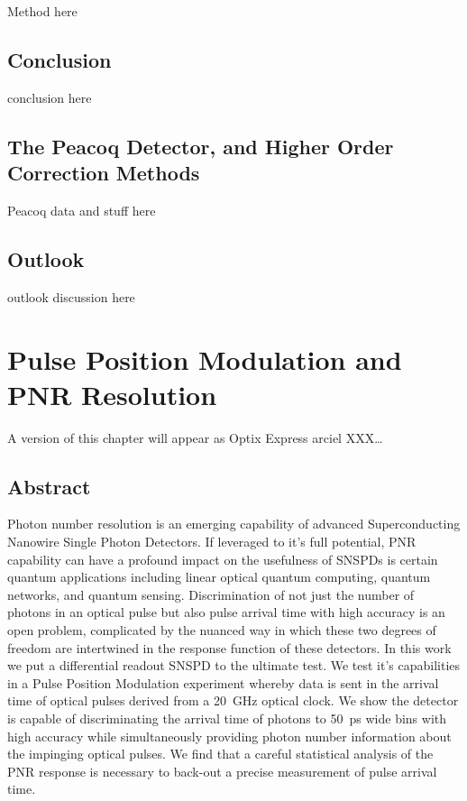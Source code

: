 \documentclass[11pt]{caltech_thesis} %
\begin{document}
Method here

\hypertarget{conclusion}{%
\section{Conclusion}\label{conclusion}}

conclusion here

\hypertarget{the-peacoq-detector-and-higher-order-correction-methods}{%
\section{The Peacoq Detector, and Higher Order Correction
Methods}\label{the-peacoq-detector-and-higher-order-correction-methods}}

Peacoq data and stuff here

\hypertarget{outlook}{%
\section{Outlook}\label{outlook}}

outlook discussion here

\hypertarget{pulse-position-modulation-and-pnr-resolution}{%
\chapter{Pulse Position Modulation and PNR
Resolution}\label{pulse-position-modulation-and-pnr-resolution}}

A version of this chapter will appear as Optix Express arciel
XXX\ldots{}

\hypertarget{abstract-2}{%
\section{Abstract}\label{abstract-2}}

Photon number resolution is an emerging capability of advanced
Superconducting Nanowire Single Photon Detectors. If leveraged to it's
full potential, PNR capability can have a profound impact on the
usefulness of SNSPDs is certain quantum applications including linear
optical quantum computing, quantum networks, and quantum sensing.
Discrimination of not just the number of photons in an optical pulse but
also pulse arrival time with high accuracy is an open problem,
complicated by the nuanced way in which these two degrees of freedom are
intertwined in the response function of these detectors. In this work we
put a differential readout SNSPD to the ultimate test. We test it's
capabilities in a Pulse Position Modulation experiment whereby data is
sent in the arrival time of optical pulses derived from a 20~GHz optical
clock. We show the detector is capable of discriminating the arrival
time of photons to 50~ps wide bins with high accuracy while
simultaneously providing photon number information about the impinging
optical pulses. We find that a careful statistical analysis of the PNR
response is necessary to back-out a precise measurement of pulse arrival
time.
\end{document}
